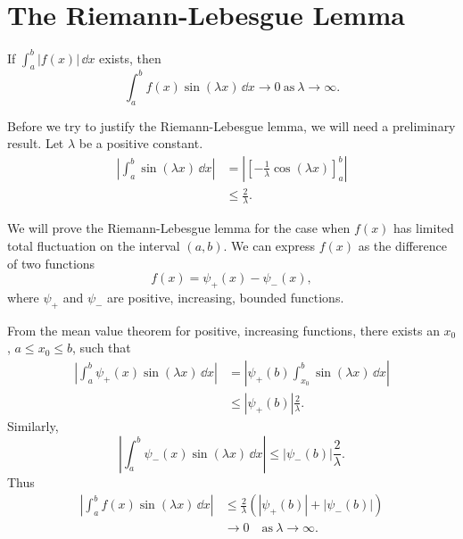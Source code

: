 \section{The Riemann-Lebesgue Lemma}

\begin{Result}
  If $\int_a^b |f(x)|\,\dd x$ exists, then
  \[ \int_a^b f(x) \sin(\lambda x)\,\dd x \to 0\ \mathrm{as}\ \lambda \to \infty.\]
\end{Result}


Before we try to justify the Riemann-Lebesgue lemma, we will need 
a preliminary result.  Let $\lambda$ be a positive constant.
\begin{align*}
  \left| \int_a^b \sin(\lambda x)\,\dd x \right|
  &= \left| \left[- \frac{1}{\lambda} \cos(\lambda x) \right]_a^b 
  \right| \\
  &\leq \frac{2}{\lambda}.
\end{align*}



We will prove the Riemann-Lebesgue lemma for the case when $f(x)$ has
limited total fluctuation on the interval $(a,b)$.  We can express $f(x)$
as the difference of two functions
\[ f(x) = \psi_+(x) - \psi_-(x),\]
where $\psi_+$ and $\psi_-$ are positive, increasing, bounded functions.

From the mean value theorem for positive, increasing functions, there
exists an $x_0$, $a \leq x_0 \leq b$, such that
\begin{align*}
  \left| \int_a^b \psi_+(x) \sin(\lambda x)\,\dd x \right|
  &= \left| \psi_+(b) \int_{x_0}^b \sin(\lambda x)\,\dd x \right| \\
  &\leq |\psi_+(b)| \frac{2}{\lambda}.
\end{align*}
Similarly,
\[ \left| \int_a^b \psi_-(x) \sin(\lambda x)\,\dd x \right|
\leq |\psi_-(b)| \frac{2}{\lambda}.\]
Thus 
\begin{align*}
  \left| \int_a^b f(x) \sin(\lambda x)\,\dd x \right|
  &\leq \frac{2}{\lambda} (|\psi_+(b)| + |\psi_-(b)|) \\
  &\to 0 \quad \mathrm{as}\ \lambda \to \infty.
\end{align*}










